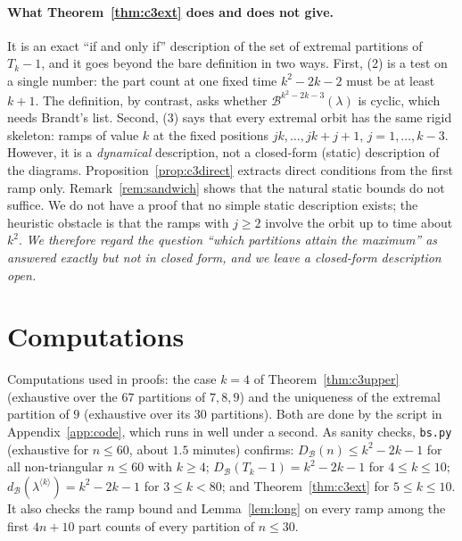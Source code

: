 \documentclass[11pt]{article}
\theoremstyle{definition}
\newcommand{\B}{\mathcal{B}}
\newcommand{\dB}{d_{\mathcal{B}}}
\newcommand{\DB}{D_{\mathcal{B}}}
\renewcommand{\le}{\leqslant}
\renewcommand{\ge}{\geqslant}
\begin{document}
\paragraph{What Theorem~\ref{thm:c3ext} does and does not give.}  It is an exact ``if and only if'' description of the
set of extremal partitions of $T_k-1$, and it goes beyond the bare definition in two ways.  First, (2) is a
test on a single number: the part count at one fixed time $k^2-2k-2$ must be at least $k+1$.  The definition, by
contrast, asks whether $\B^{k^2-2k-3}(\lambda)$ is cyclic, which needs Brandt's list.  Second, (3) says that every
extremal orbit has the same rigid skeleton: ramps of value $k$ at the fixed positions $jk,\dots,jk+j+1$,
$j=1,\dots,k-3$.  However, it is a \emph{dynamical} description, not a closed-form (static) description of the
diagrams.  Proposition~\ref{prop:c3direct} extracts direct conditions from the first ramp only.
Remark~\ref{rem:sandwich} shows that the natural static bounds do not suffice.  We do not have a proof that no
simple static description exists; the heuristic obstacle is that the ramps with $j\ge2$ involve the orbit up to
time about $k^2$.  \emph{We therefore regard the question ``which partitions attain the maximum'' as answered
exactly but not in closed form, and we leave a closed-form description open.}

\section{Computations}
Computations used in proofs: the case $k=4$ of Theorem~\ref{thm:c3upper} (exhaustive over the $67$ partitions
of $7,8,9$) and the uniqueness of the extremal partition of $9$ (exhaustive over its $30$ partitions).  Both are
done by the script in Appendix~\ref{app:code}, which runs in well under a second.  As sanity checks, \texttt{bs.py} (exhaustive for
$n\le60$, about $1.5$ minutes) confirms: $\DB(n)\le k^2-2k-1$ for all non-triangular $n\le60$ with $k\ge4$;
$\DB(T_k-1)=k^2-2k-1$ for $4\le k\le10$; $\dB(\lambda^{\langle k\rangle})=k^2-2k-1$ for $3\le k<80$; and
Theorem~\ref{thm:c3ext} for $5\le k\le10$.  It also checks the ramp bound and Lemma~\ref{lem:long} on
every ramp among the first $4n+10$ part counts of every partition of $n\le30$.

\appendix
\end{document}
